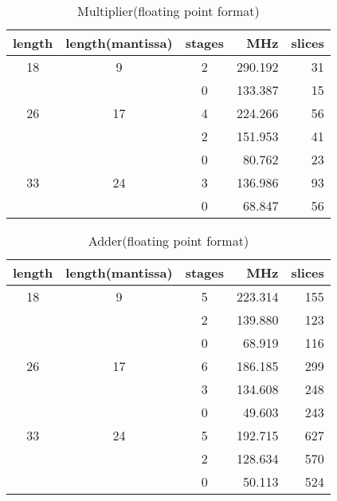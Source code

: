 \documentclass[times, 10pt,twocolumn]{article}
\begin{document}
\begin{table}
\caption{Multiplier(floating point format)}
\begin{center}
\begin{tabular}{cccrr}
\hline
\hline
length  & length(mantissa) & stages & MHz & slices\\
\hline
18   &  9 & 2 & 290.192 &  31 \\
     &    & 0 & 133.387 &  15 \\
\hline
26   & 17 & 4 & 224.266 &  56 \\
     &    & 2 & 151.953 &  41 \\
     &    & 0 &  80.762 &  23 \\
\hline
33   & 24 & 3 & 136.986 &  93 \\
     &    & 0 &  68.847 &  56\\
\hline
\hline
\end{tabular}
\end{center}
\label{tabpg_float_mult}
\end{table}


\begin{table}
\caption{Adder(floating point format)}
\begin{center}
\begin{tabular}{cccrr}
\hline
\hline
length  & length(mantissa) & stages & MHz & slices\\
\hline
18   &  9 & 5 & 223.314 & 155 \\
     &    & 2 & 139.880 & 123 \\
     &    & 0 &  68.919 & 116 \\
\hline
26   & 17 & 6 & 186.185 & 299 \\
     &    & 3 & 134.608 & 248 \\
     &    & 0 &  49.603 & 243 \\
\hline
33   & 24 & 5 & 192.715 & 627 \\
     &    & 2 & 128.634 & 570 \\
     &    & 0 &  50.113 & 524 \\
\hline
\hline
\end{tabular}
\end{center}
\label{tabpg_float_unsigned_add}
\end{table}
\end{document}
